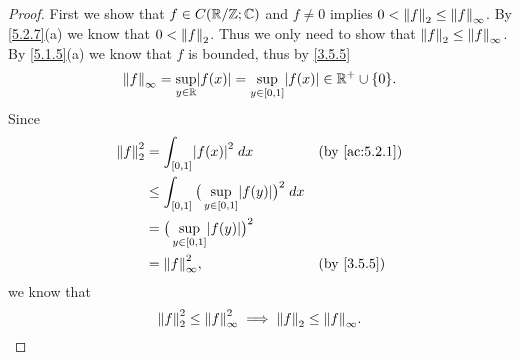 \begin{proof}
  First we show that \(f \in C(\R / \Z ; \C)\) and \(f \neq 0\) implies \(0 < \norm*{f}_2 \leq \norm*{f}_{\infty}\).
  By \cref{5.2.7}(a) we know that \(0 < \norm*{f}_2\).
  Thus we only need to show that \(\norm*{f}_2 \leq \norm*{f}_\infty\).
  By \cref{5.1.5}(a) we know that \(f\) is bounded, thus by \cref{3.5.5}
  \[
    \norm*{f}_{\infty} = \sup_{y \in \R} \abs{f(x)} = \sup_{y \in [0, 1]} \abs{f(x)} \in \R^+ \cup \set{0}.
  \]
  Since
  \begin{align*}
    \norm*{f}_2^2 & = \int_{[0, 1]} \abs{f(x)}^2 \; dx                                  &  & \by{ac:5.2.1} \\
                  & \leq \int_{[0, 1]} \big(\sup_{y \in [0, 1]} \abs{f(y)}\big)^2 \; dx                    \\
                  & = \big(\sup_{y \in [0, 1]} \abs{f(y)}\big)^2                                           \\
                  & = \norm*{f}_{\infty}^2,                                             &  & \by{3.5.5}
  \end{align*}
  we know that
  \[
    \norm*{f}_2^2 \leq \norm*{f}_{\infty}^2 \implies \norm*{f}_2 \leq \norm*{f}_{\infty}.
  \]


\end{proof}
